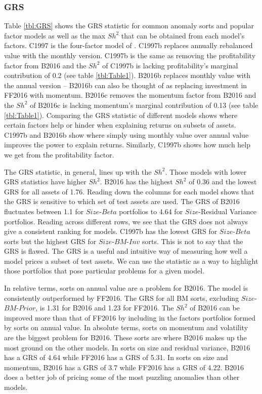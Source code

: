 
\subsubsection{GRS}


Table \ref{tbl:GRS} shows the GRS statistic for common anomaly sorts and popular factor
models as well as the max $Sh^2$ that can be obtained from each model's factors. C1997 is
the four-factor model of \textcite{carhart1997persistence}. C1997b replaces annually
rebalanced value with the monthly version. C1997b is the same as removing the
profitability factor from B2016 and the $Sh^2$ of C1997b is lacking profitability's
marginal contribution of 0.2 (see table \ref{tbl:Table1}). B2016b replaces monthly value
with the annual version -- B2016b can also be thought of as replacing investment in FF2016
with momentum. B2016c removes the momentum factor from B2016 and the $Sh^2$ of B2016c is
lacking momentum's marginal contribution of 0.13 (see table \ref{tbl:Table1}). Comparing
the GRS statistic of different models shows where certain factors help or hinder when
explaining returns on subsets of assets. C1997b and B2016b show where simply using monthly
value over annual value improves the power to explain returns. Similarly, C1997b shows how
much help we get from the profitability factor.

The GRS statistic, in general, lines up with the $Sh^2$. Those models with lower GRS
statistics have higher $Sh^2$. B2016 has the highest $Sh^2$ of 0.36 and the lowest GRS for
all assets of 1.76. Reading down the columns for each model shows that the GRS is
sensitive to which set of test assets are used. The GRS of B2016 fluctuates between 1.1
for $Size$-$Beta$ portfolios to 4.64 for $Size$-Residual Variance portfolios. Reading
across different rows, we see that the GRS does not always give a consistent ranking for
models. C1997b has the lowest GRS for $Size$-$Beta$ sorts but the highest GRS for
$Size$-$BM$-$Inv$ sorts. This is not to say that the GRS is flawed. The GRS is a useful
and intuitive way of measuring how well a model prices a subset of test assets. We can use
the statistic as a way to highlight those portfolios that pose particular problems for a
given model.

In relative terms, sorts on annual value are a problem for B2016. The model is
consistently outperformed by FF2016. The GRS for all BM sorts, excluding
$Size$-$BM$-$Prior$, is 1.31 for B2016 and 1.23 for FF2016. The $Sh^2$ of B2016 can be
improved more than that of FF2016 by including in the factors portfolios formed by sorts
on annual value. In absolute terms, sorts on momentum and volatility are the biggest
problem for B2016. These sorts are where B2016 makes up the most ground on the other
models. In sorts on size and residual variance, B2016 has a GRS of 4.64 while FF2016 has a
GRS of 5.31. In sorts on size and momentum, B2016 has a GRS of 3.7 while FF2016 has a GRS
of 4.22. B2016 does a better job of pricing some of the most puzzling anomalies
\parencite{fama2016dissecting} than other models.

